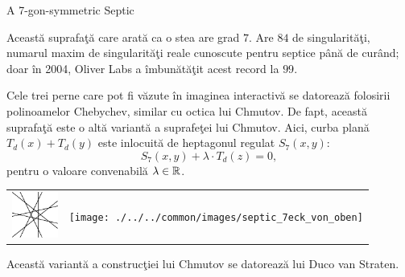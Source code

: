\begin{surferPage}[7-gon]{A 7-gon-symmetric Septic}

     Aceast\u{a} suprafa\c{t}\u{a} care arat\u{a} ca o stea are grad $7$.
     Are $84$ de singularit\u{a}\c{t}i, numarul maxim de singularit\u{a}\c{t}i 
     reale cunoscute pentru septice p\^{a}n\u{a} de cur\^{a}nd; doar 
     \^{i}n 2004, Oliver Labs a \^{i}mbun\u{a}t\u{a}\c{t}it acest record la $99$.
     
  Cele trei perne care pot fi v\u{a}zute \^{i}n imaginea interactiv\u{a} 
    se datoreaz\u{a} folosirii polinoamelor Chebychev, similar cu octica lui Chmutov.
    De fapt, aceast\u{a} suprafa\c{t}\u{a} este o alt\u{a} variant\u{a} a suprafe\c{t}ei lui Chmutov. Aici,
    curba plan\u{a} $T_d(x)+T_d(y)$ este inlocuit\u{a} de heptagonul regulat $S_7(x,y)$: 
   \[S_7(x,y) + \lambda \cdot T_d(z) = 0,\]
    pentru o valoare convenabil\u{a} $\lambda\in{\mathbb R}$. 
      \vspace*{-0.3em}
    \begin{center}
      \begin{tabular}{c@{\qquad}c}
        \includegraphics[height=1.5cm]{./../../common/images/labsseptic1.pdf}
        &
        \texttt{[image: ./../../common/images/septic\_7eck\_von\_oben]}
      \end{tabular}
    \end{center}
    \vspace*{-0.3em}   
   Aceast\u{a} variant\u{a} a construc\c{t}iei lui Chmutov se datoreaz\u{a} lui Duco van Straten.

\end{surferPage}
